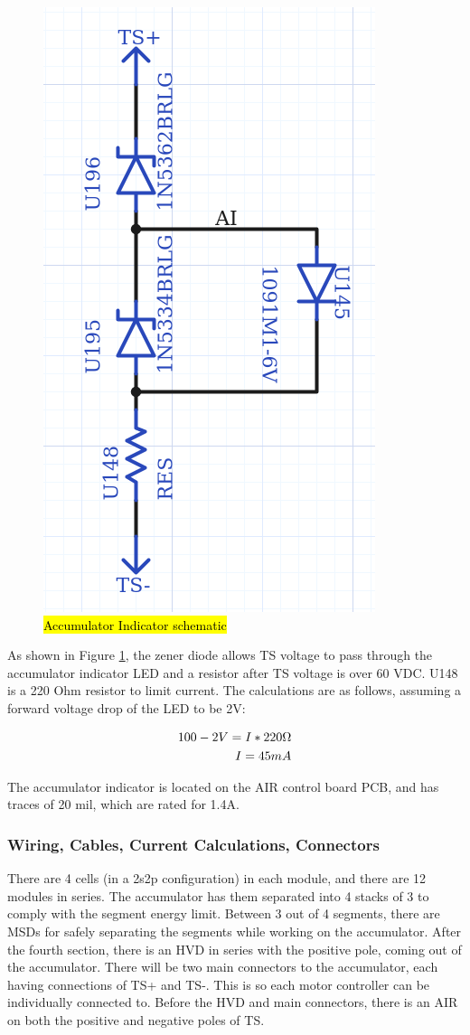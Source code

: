 \documentclass{article}
\DeclareRobustCommand{\hlr}[1]{{\sethlcolor{red}\hl{#1}}}
\begin{document}
            \begin{figure}[H]
                \centering
                \includegraphics[width = 0.3 \textwidth]{aischem}
                \caption{\hlr{Accumulator Indicator schematic}}
                \label{aischem}
            \end{figure}

            As shown in Figure \ref{aischem}, the zener diode allows TS voltage to pass through the accumulator indicator LED and a resistor after TS voltage is over 60 VDC.  U148 is a 220 Ohm resistor to limit current. The calculations are as follows, assuming a forward voltage drop of the LED to be 2V:

            \begin{align}
                100-2 V = I * 220 \ohm \\
                I = 45 mA
            \end{align}

            The accumulator indicator is located on the AIR control board PCB, and has traces of 20 mil, which are rated for 1.4A.

        \subsubsection{Wiring, Cables, Current Calculations, Connectors} \label{batteryconnectors}

            There are 4 cells (in a 2s2p configuration) in each module, and there are 12 modules in series. The accumulator has them separated into 4 stacks of 3 to comply with the segment energy limit. Between 3 out of 4 segments, there are MSDs for safely separating the segments while working on the accumulator. After the fourth section, there is an HVD in series with the positive pole, coming out of the accumulator. There will be two main connectors to the accumulator, each having connections of TS+ and TS-. This is so each motor controller can be individually connected to. Before the HVD and main connectors, there is an AIR on both the positive and negative poles of TS.
\end{document}
